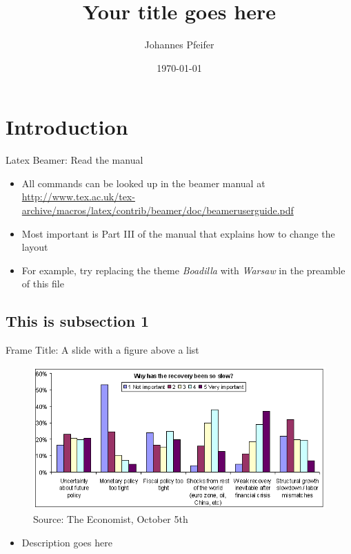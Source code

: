 \documentclass[aspectratio=169]{beamer}
\title{Your title goes here}
\date{\today}
\author{Johannes Pfeifer}
\institute{Universität der Bundeswehr München}
\begin{document}
\begin{frame}
  \titlepage
\end{frame}


\begin{frame}
    \tableofcontents
\end{frame}

\section{Introduction}
\begin{frame}{Latex Beamer: Read the manual}
    \begin{itemize}
        \item All commands can be looked up in the beamer manual at
            \url{http://www.tex.ac.uk/tex-archive/macros/latex/contrib/beamer/doc/beameruserguide.pdf}
        \item Most important is Part III of the manual that explains how to change the layout
        \item For example, try replacing the theme \textit{Boadilla} with \textit{Warsaw} in the preamble of this file
    \end{itemize}
\end{frame}


\subsection{This is subsection 1}
\begin{frame}{Frame Title: A slide with a figure above a list}
    \begin{figure}
        \includegraphics[scale=.3]{why_has_the_recovery_been_so_slow_all_respondents_0}
        \caption{Source: The Economist, October 5th}
    \end{figure}
    \begin{itemize}
        \item Description goes here
    \end{itemize}
\end{frame}
\end{document}
